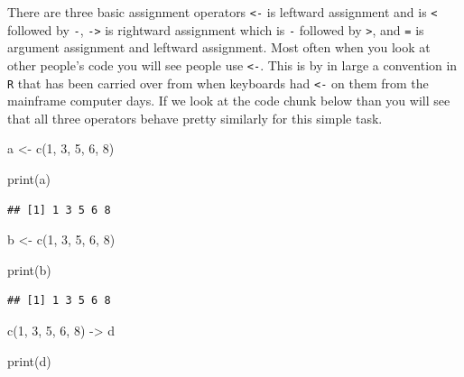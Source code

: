\documentclass[]{tufte-handout}
\newenvironment{Shaded}{}{}
\newcommand{\DecValTok}[1]{\textcolor[rgb]{0.25,0.63,0.44}{#1}}
\newcommand{\FunctionTok}[1]{\textcolor[rgb]{0.02,0.16,0.49}{#1}}
\newcommand{\NormalTok}[1]{#1}
\newcommand{\OtherTok}[1]{\textcolor[rgb]{0.00,0.44,0.13}{#1}}
\begin{document}
There are three basic assignment operators \texttt{\textless{}-} is
leftward assignment and is \texttt{\textless{}} followed by \texttt{-},
\texttt{-\textgreater{}} is rightward assignment which is \texttt{-}
followed by \texttt{\textgreater{}}, and \texttt{=} is argument
assignment and leftward assignment. Most often when you look at other
people's code you will see people use \texttt{\textless{}-}. This is by
in large a convention in \texttt{R} that has been carried over from when
keyboards had \texttt{\textless{}-} on them from the mainframe computer
days. If we look at the code chunk below than you will see that all
three operators behave pretty similarly for this simple task.

\begin{Shaded}
\begin{Highlighting}[]
\NormalTok{a }\OtherTok{\textless{}{-}} \FunctionTok{c}\NormalTok{(}\DecValTok{1}\NormalTok{, }\DecValTok{3}\NormalTok{, }\DecValTok{5}\NormalTok{, }\DecValTok{6}\NormalTok{, }\DecValTok{8}\NormalTok{)}

\FunctionTok{print}\NormalTok{(a)}
\end{Highlighting}
\end{Shaded}

\begin{verbatim}
## [1] 1 3 5 6 8
\end{verbatim}

\begin{Shaded}
\begin{Highlighting}[]
\NormalTok{b }\OtherTok{\textless{}{-}} \FunctionTok{c}\NormalTok{(}\DecValTok{1}\NormalTok{, }\DecValTok{3}\NormalTok{, }\DecValTok{5}\NormalTok{, }\DecValTok{6}\NormalTok{, }\DecValTok{8}\NormalTok{)}

\FunctionTok{print}\NormalTok{(b)}
\end{Highlighting}
\end{Shaded}

\begin{verbatim}
## [1] 1 3 5 6 8
\end{verbatim}

\begin{Shaded}
\begin{Highlighting}[]
\FunctionTok{c}\NormalTok{(}\DecValTok{1}\NormalTok{, }\DecValTok{3}\NormalTok{, }\DecValTok{5}\NormalTok{, }\DecValTok{6}\NormalTok{, }\DecValTok{8}\NormalTok{) }\OtherTok{{-}\textgreater{}}\NormalTok{ d}

\FunctionTok{print}\NormalTok{(d)}
\end{Highlighting}
\end{Shaded}
\end{document}
